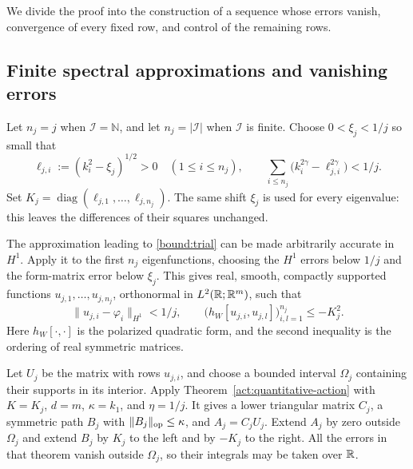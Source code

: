 We divide the proof into the construction of a sequence whose errors
vanish, convergence of every fixed row, and control of the remaining rows.

\subsection{Finite spectral approximations and vanishing errors}
\label{comp:approximation}

Let $n_j=j$ when $\mathcal I=\mathbb N$, and let $n_j=|\mathcal I|$ when
$\mathcal I$ is finite.  Choose $0<\xi_j<1/j$ so small that
\begin{equation}
 \ell_{j,i}:=(k_i^2-\xi_j)^{1/2}>0\quad(1\leq i\leq n_j),
 \qquad
 \sum_{i\leq n_j}\bigl(k_i^{2\gamma}-\ell_{j,i}^{2\gamma}\bigr)<1/j.
 \label{comp:common-shift}
\end{equation}
Set $K_j=\operatorname{diag}(\ell_{j,1},\ldots,\ell_{j,n_j})$.
The same shift $\xi_j$ is used for every eigenvalue: this leaves the
differences of their squares unchanged.

The approximation leading to \eqref{bound:trial} can be made arbitrarily
accurate in $H^1$.  Apply it to the first $n_j$ eigenfunctions, choosing
the $H^1$ errors below $1/j$ and the form-matrix error below $\xi_j$.
This gives real, smooth, compactly supported functions
$u_{j,1},\ldots,u_{j,n_j}$, orthonormal in $L^2(\mathbb R;\mathbb R^m)$, such that
\begin{equation}
 \|u_{j,i}-\varphi_i\|_{H^1}<1/j,
 \qquad
 \bigl(h_W[u_{j,i},u_{j,l}]\bigr)_{i,l=1}^{n_j}\leq-K_j^2.
 \label{comp:form-approximation}
\end{equation}
Here $h_W[\cdot,\cdot]$ is the polarized quadratic form, and the second
inequality is the ordering of real symmetric matrices.

Let $U_j$ be the matrix with rows $u_{j,i}$, and choose a bounded interval
$\Omega_j$ containing their supports in its interior.  Apply
Theorem~\ref{act:quantitative-action} with $K=K_j$, $d=m$, $\kappa=k_1$,
and $\eta=1/j$.  It gives a lower triangular matrix $C_j$, a symmetric
path $B_j$ with $\|B_j\|_{\operatorname{op}}\leq\kappa$, and $A_j=C_jU_j$.
Extend $A_j$ by zero outside $\Omega_j$ and extend $B_j$ by $K_j$ to the
left and by $-K_j$ to the right.  All the errors in that theorem vanish
outside $\Omega_j$, so their integrals may be taken over $\mathbb R$.

